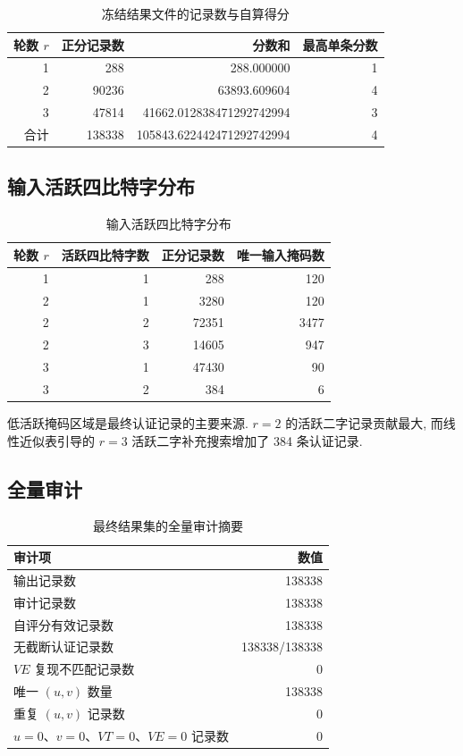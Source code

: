 \documentclass[UTF8,a4paper,zihao=-4,fontset=fandol]{ctexart}
\numberwithin{equation}{section}
\theoremstyle{definition}
\theoremstyle{plain}
\theoremstyle{remark}
\begin{document}
\begin{table}[H]
\centering
\caption{冻结结果文件的记录数与自算得分}
\label{tab:score}
\begin{tabular}{rrrr}
\toprule
轮数 $r$ & 正分记录数 & 分数和 & 最高单条分数 \\
\midrule
1 & 288 & 288.000000 & 1 \\
2 & 90236 & 63893.609604 & 4 \\
3 & 47814 & 41662.012838471292742994 & 3 \\
\midrule
合计 & 138338 & 105843.622442471292742994 & 4 \\
\bottomrule
\end{tabular}
\end{table}

\subsection{输入活跃四比特字分布}

\begin{table}[H]
\centering
\caption{输入活跃四比特字分布}
\label{tab:active}
\begin{tabular}{rrrr}
\toprule
轮数 $r$ & 活跃四比特字数 & 正分记录数 & 唯一输入掩码数 \\
\midrule
1 & 1 & 288 & 120 \\
2 & 1 & 3280 & 120 \\
2 & 2 & 72351 & 3477 \\
2 & 3 & 14605 & 947 \\
3 & 1 & 47430 & 90 \\
3 & 2 & 384 & 6 \\
\bottomrule
\end{tabular}
\end{table}

低活跃掩码区域是最终认证记录的主要来源. $r=2$ 的活跃二字记录贡献最大, 而线性近似表引导的 $r=3$ 活跃二字补充搜索增加了 384 条认证记录.

\subsection{全量审计}

\begin{table}[H]
\centering
\caption{最终结果集的全量审计摘要}
\label{tab:audit}
\begin{tabularx}{0.80\textwidth}{L r}
\toprule
审计项 & 数值 \\
\midrule
输出记录数 & 138338 \\
审计记录数 & 138338 \\
自评分有效记录数 & 138338 \\
无截断认证记录数 & 138338/138338 \\
$VE$ 复现不匹配记录数 & 0 \\
唯一 $(u,v)$ 数量 & 138338 \\
重复 $(u,v)$ 记录数 & 0 \\
$u=0$、$v=0$、$VT=0$、$VE=0$ 记录数 & 0 \\
\bottomrule
\end{tabularx}
\end{table}
\end{document}
